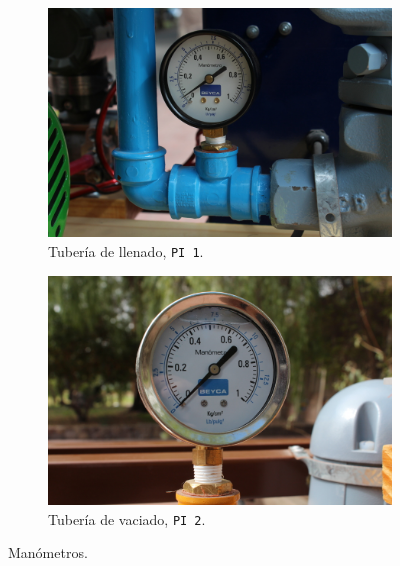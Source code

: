 \begin{figure}[t]
        \centering
        \begin{subfigure}[b]{0.48\textwidth}
\includegraphics[width=\textwidth]
	{Cap2-DisenoEnsamblado/images/manometro1.JPG}
	\caption{Tubería de llenado, \texttt{PI 1}.}
        \end{subfigure}%
        \hfill
        \begin{subfigure}[b]{0.48\textwidth}
\includegraphics[width=\textwidth]
	{Cap2-DisenoEnsamblado/images/manometro2.JPG}
	\caption{Tubería de vaciado, \texttt{PI 2}.}
        \end{subfigure}
        \caption{Manómetros.}
        \label{fig:manometro}
\end{figure}

